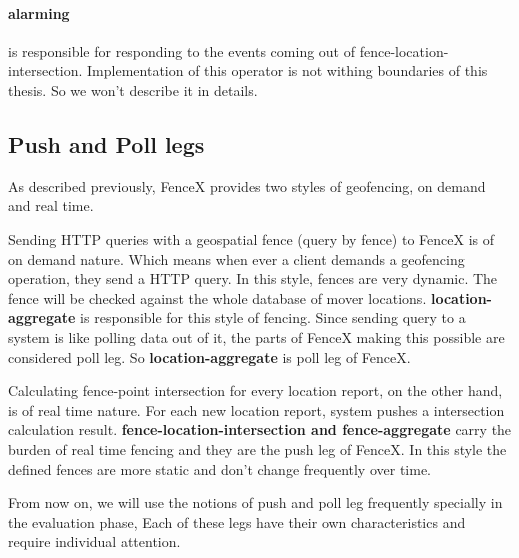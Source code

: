 \documentclass[a4]{report}
\begin{document}
    \paragraph{alarming} is responsible for responding to the events coming out of fence-location-intersection.
    Implementation of this operator is not withing boundaries of this thesis.
    So we won't describe it in details.

    \subsection{Push and Poll legs}
    As described previously, FenceX provides two styles of geofencing, on demand and real time.

    Sending HTTP queries with a geospatial fence (query by fence) to FenceX is of on demand nature.
    Which means when ever a client demands a geofencing operation, they send a HTTP query.
    In this style, fences are very dynamic.
    The fence will be checked against the whole database of mover locations.
    \textbf{location-aggregate} is responsible for this style of fencing.
    Since sending query to a system is like polling data out of it, the parts of FenceX making this possible are
    considered poll leg.
    So \textbf{location-aggregate} is poll leg of FenceX.

    Calculating fence-point intersection for every location report, on the other hand, is of real time nature.
    For each new location report, system pushes a intersection calculation result.
    \textbf{fence-location-intersection and fence-aggregate} carry the burden of real time fencing and they are the
    push leg of FenceX.
    In this style the defined fences are more static and don't change frequently over time.

    From now on, we will use the notions of push and poll leg frequently specially in the evaluation phase, Each of
    these legs have their own characteristics and require individual attention.
\end{document}
